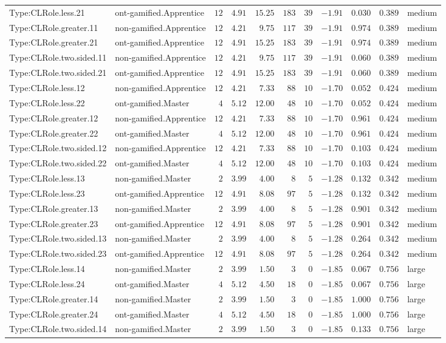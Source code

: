 \documentclass[6pt,a4paper]{article}
\begin{document}
{\begin{longtable}{llrrrrrrrrl}
Type:CLRole.less.21&ont-gamified.Apprentice&$12$&$4.91$&$15.25$&$183$&$39$&$-1.91$&$0.030$&$0.389$&medium\tabularnewline
Type:CLRole.greater.11&non-gamified.Apprentice&$12$&$4.21$&$ 9.75$&$117$&$39$&$-1.91$&$0.974$&$0.389$&medium\tabularnewline
Type:CLRole.greater.21&ont-gamified.Apprentice&$12$&$4.91$&$15.25$&$183$&$39$&$-1.91$&$0.974$&$0.389$&medium\tabularnewline
Type:CLRole.two.sided.11&non-gamified.Apprentice&$12$&$4.21$&$ 9.75$&$117$&$39$&$-1.91$&$0.060$&$0.389$&medium\tabularnewline
Type:CLRole.two.sided.21&ont-gamified.Apprentice&$12$&$4.91$&$15.25$&$183$&$39$&$-1.91$&$0.060$&$0.389$&medium\tabularnewline
Type:CLRole.less.12&non-gamified.Apprentice&$12$&$4.21$&$ 7.33$&$ 88$&$10$&$-1.70$&$0.052$&$0.424$&medium\tabularnewline
Type:CLRole.less.22&ont-gamified.Master&$ 4$&$5.12$&$12.00$&$ 48$&$10$&$-1.70$&$0.052$&$0.424$&medium\tabularnewline
Type:CLRole.greater.12&non-gamified.Apprentice&$12$&$4.21$&$ 7.33$&$ 88$&$10$&$-1.70$&$0.961$&$0.424$&medium\tabularnewline
Type:CLRole.greater.22&ont-gamified.Master&$ 4$&$5.12$&$12.00$&$ 48$&$10$&$-1.70$&$0.961$&$0.424$&medium\tabularnewline
Type:CLRole.two.sided.12&non-gamified.Apprentice&$12$&$4.21$&$ 7.33$&$ 88$&$10$&$-1.70$&$0.103$&$0.424$&medium\tabularnewline
Type:CLRole.two.sided.22&ont-gamified.Master&$ 4$&$5.12$&$12.00$&$ 48$&$10$&$-1.70$&$0.103$&$0.424$&medium\tabularnewline
Type:CLRole.less.13&non-gamified.Master&$ 2$&$3.99$&$ 4.00$&$  8$&$ 5$&$-1.28$&$0.132$&$0.342$&medium\tabularnewline
Type:CLRole.less.23&ont-gamified.Apprentice&$12$&$4.91$&$ 8.08$&$ 97$&$ 5$&$-1.28$&$0.132$&$0.342$&medium\tabularnewline
Type:CLRole.greater.13&non-gamified.Master&$ 2$&$3.99$&$ 4.00$&$  8$&$ 5$&$-1.28$&$0.901$&$0.342$&medium\tabularnewline
Type:CLRole.greater.23&ont-gamified.Apprentice&$12$&$4.91$&$ 8.08$&$ 97$&$ 5$&$-1.28$&$0.901$&$0.342$&medium\tabularnewline
Type:CLRole.two.sided.13&non-gamified.Master&$ 2$&$3.99$&$ 4.00$&$  8$&$ 5$&$-1.28$&$0.264$&$0.342$&medium\tabularnewline
Type:CLRole.two.sided.23&ont-gamified.Apprentice&$12$&$4.91$&$ 8.08$&$ 97$&$ 5$&$-1.28$&$0.264$&$0.342$&medium\tabularnewline
Type:CLRole.less.14&non-gamified.Master&$ 2$&$3.99$&$ 1.50$&$  3$&$ 0$&$-1.85$&$0.067$&$0.756$&large\tabularnewline
Type:CLRole.less.24&ont-gamified.Master&$ 4$&$5.12$&$ 4.50$&$ 18$&$ 0$&$-1.85$&$0.067$&$0.756$&large\tabularnewline
Type:CLRole.greater.14&non-gamified.Master&$ 2$&$3.99$&$ 1.50$&$  3$&$ 0$&$-1.85$&$1.000$&$0.756$&large\tabularnewline
Type:CLRole.greater.24&ont-gamified.Master&$ 4$&$5.12$&$ 4.50$&$ 18$&$ 0$&$-1.85$&$1.000$&$0.756$&large\tabularnewline
Type:CLRole.two.sided.14&non-gamified.Master&$ 2$&$3.99$&$ 1.50$&$  3$&$ 0$&$-1.85$&$0.133$&$0.756$&large\tabularnewline

\end{longtable}}
\end{document}
